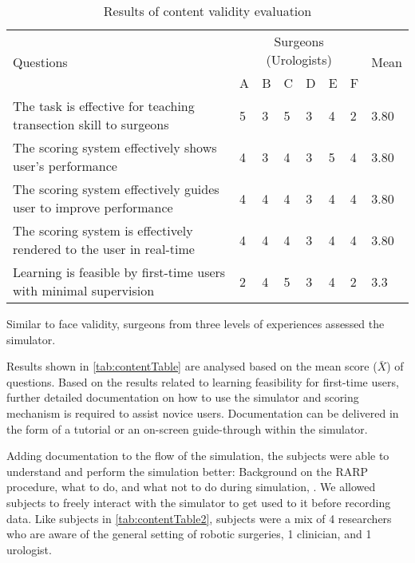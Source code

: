 \begin{table}
\small
\centering
\begin{tabular}{p{6cm}p{0.5cm}p{0.5cm}p{0.5cm}p{0.5cm}p{0.5cm}p{0.5cm}p{0.8cm}}
  \multirow{2}{4em}{Questions} & \multicolumn{6}{c}{Surgeons (Urologists)} & \multirow{2}{4em}{Mean}\\
  \cmidrule{2-7}
  & A & B & C & D & E & F &\\
  \toprule
  The task is effective for teaching transection skill to surgeons
  & 5& 3& 5& 3 & 4& 2 & 3.80\\
  \midrule
   The scoring system effectively shows user's performance
  & 4& 3& 4 & 3 & 5 & 4 & 3.80\\
  \midrule
   The scoring system effectively guides user to improve performance
  & 4 & 4 & 4& 3& 4 & 4 & 3.80\\
  \midrule
  The scoring system is effectively rendered to the user in real-time
  & 4 & 4 & 4& 3& 4 & 4 & 3.80\\
  \midrule
  Learning is feasible by first-time users with minimal supervision & 2 & 4 & 5 & 3 & 4& 2 & 3.3\\
  \bottomrule
\end{tabular}
\caption{Results of content validity evaluation}\label{tab:contentTable}
\end{table}

Similar to face validity, surgeons from three levels of experiences assessed the simulator.

Results shown in \autoref{tab:contentTable} are analysed based on the mean score ($\bar{X}$) of questions. Based on the results related to learning feasibility for first-time users, further detailed documentation on how to use the simulator and scoring mechanism is required to assist novice users. Documentation can be delivered in the form of a tutorial or an on-screen guide-through within the simulator.

Adding documentation to the flow of the simulation, the subjects were able to understand and perform the simulation better: Background on the RARP procedure, what to do, and what not to do during simulation, \etc. We allowed subjects to freely interact with the simulator to get used to it before recording data. Like subjects in \autoref{tab:contentTable2}, subjects were a mix of 4 researchers who are aware of the general setting of robotic surgeries, 1 clinician, and 1 urologist.

